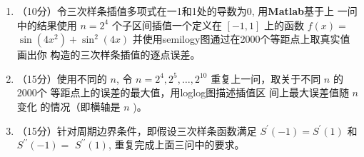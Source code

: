 \documentclass[12pt,a4paper,UTF8]{ctexart}
\theoremstyle{nonumberplain}
\begin{document}
\begin{enumerate}
\begin{enumerate}
$$\begin{array}{c}
M_{n}
\end{array}\right]=\left[\begin{array}{c}
d_{0} \\
d_{1} \\
d_{2} \\
\vdots \\
d_{n-1} \\
d_{n}
\end{array}\right]
$$
\item（10分）令三次样条插值多项式在一1和1处的导数为0, 用\textbf{Matlab}基于上
    一问中的结果使用 $n=2^{4}$ 个子区间插值一个定义在 $[-1,1]$ 上的函数 $f(x)=$ $\sin \left(4 x^{2}\right)+\sin ^{2}(4 x)$ 并使用semilogy图通过在2000个等距点上取真实值画出你 构造的三次样条插值的逐点误差。
    \item（15分）使用不同的 $n$, 令 $n=2^{4}, 2^{5}, \ldots, 2^{10}$ 重复上一问，取关于不同 $n$ 的2000个
    等距点上的误差的最大值，用loglog图描述插值区
    间上最大误差值随 $n$ 变化
    的情况（即横轴是 $n$ )。
    \item（15分）针对周期边界条件，即假设三次样条函数满足 $S^{\prime}(-1)=S^{\prime}(1)$ 和 $S^{\prime \prime}(-1)=$ $S^{\prime \prime}(1)$, 重复完成上面三问中的要求。
         


\end{enumerate}
\end{enumerate}
\end{document}

